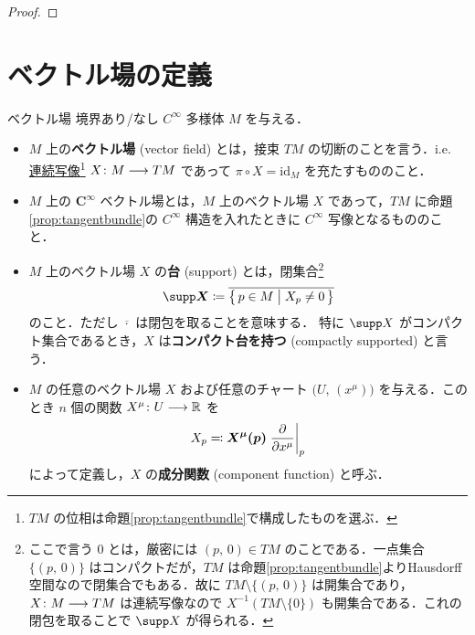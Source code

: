 \documentclass[TQFT_main]{subfiles}
\begin{document}
\begin{proof}

\end{proof}

\section{ベクトル場の定義}

\begin{mydef}[label=def:vecf]{ベクトル場}
    境界あり/なし $C^\infty$ 多様体 $M$ を与える．
    \begin{itemize}
        \item $M$ 上の\textbf{ベクトル場} (vector field) とは，接束 $TM$ の切断のことを言う．i.e. \underline{連続写像}\footnote{$TM$ の位相は命題\ref{prop:tangentbundle}で構成したものを選ぶ．} $X \colon M \longrightarrow TM$ であって $\pi \circ X = \mathrm{id}_M$ を充たすもののこと．
        \item $M$ 上の $\bm{C^\infty}$ ベクトル場とは，$M$ 上のベクトル場 $X$ であって，$TM$ に命題\ref{prop:tangentbundle}の $C^\infty$ 構造を入れたときに $C^\infty$ 写像となるもののこと．
        \item $M$ 上のベクトル場 $X$ の\textbf{台} (support) とは，閉集合\footnote{ここで言う $0$ とは，厳密には $(p,\, 0) \in TM$ のことである．一点集合 $\{(p,\, 0) \}$ はコンパクトだが，$T M$ は命題\ref{prop:tangentbundle}よりHausdorff空間なので閉集合でもある．故に $T M \setminus \{(p,\, 0) \}$ は開集合であり，$X \colon M \longrightarrow TM$ は連続写像なので $X^{-1}(TM \setminus \{0\})$ も開集合である．これの閉包を取ることで $\supp X$ が得られる．}
        \begin{align}
            \bm{\supp X} \coloneqq \overline{\bigl\{\, p \in M \bigm| X_p \neq 0 \,\bigr\} }
        \end{align}
        のこと．ただし $\overline{\cdot}$ は閉包を取ることを意味する．
        特に $\supp X$ がコンパクト集合であるとき，$X$ は\textbf{コンパクト台を持つ} (compactly supported) と言う．
        \item $M$ の任意のベクトル場 $X$ および任意のチャート $\bigl(U,\, (x^\mu)\bigr)$ を与える．このとき $n$ 個の関数 $X^\mu \colon U \longrightarrow \mathbb{R}$ を
        \begin{align}
            X_p \eqqcolon \bm{X^\mu (p)} \eval{\pdv{}{x^\mu}}_p
        \end{align}
        によって定義し，$X$ の\textbf{成分関数} (component function) と呼ぶ．
    \end{itemize}
\end{mydef}
\end{document}
